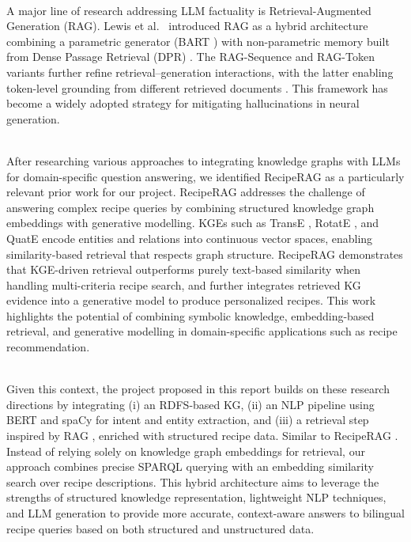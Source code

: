\documentclass[conference]{IEEEtran}
\begin{document}
\noindent
\\
A major line of research addressing LLM factuality is Retrieval-Augmented Generation (RAG). Lewis et al.~\cite{lewis2020rag} introduced RAG as a hybrid architecture combining a parametric generator (BART \cite{lewis2019bart}) with non-parametric memory built from Dense Passage Retrieval (DPR) \cite{karpukhin2020dense_passage_retrieval}. The RAG-Sequence and RAG-Token variants further refine retrieval–generation interactions, with the latter enabling token-level grounding from different retrieved documents \cite{lewis2020rag}. This framework has become a widely adopted strategy for mitigating hallucinations in neural generation.


\noindent
\\
After researching various approaches to integrating knowledge graphs with LLMs for domain-specific question answering, we identified RecipeRAG \cite{loesch2025reciperag} as a particularly relevant prior work for our project. RecipeRAG addresses the challenge of answering complex recipe queries by combining structured knowledge graph embeddings with generative modelling. KGEs such as TransE \cite{bordes2013translating}, RotatE \cite{sun2019rotate}, and QuatE \cite{zhang2019quaternion} encode entities and relations into continuous vector spaces, enabling similarity-based retrieval that respects graph structure. RecipeRAG demonstrates that KGE-driven retrieval outperforms purely text-based similarity when handling multi-criteria recipe search, and further integrates retrieved KG evidence into a generative model to produce personalized recipes. This work highlights the potential of combining symbolic knowledge, embedding-based retrieval, and generative modelling in domain-specific applications such as recipe recommendation.


\noindent
\\
Given this context, the project proposed in this report builds on these research directions by integrating (i) an RDFS-based KG, (ii) an NLP pipeline using BERT \cite{devlin2019bert} and spaCy \cite{honnibal2020spacy} for intent and entity extraction, and (iii) a retrieval step inspired by RAG \cite{lewis2020rag}, enriched with structured recipe data. Similar to RecipeRAG \cite{loesch2025reciperag}. Instead of relying solely on knowledge graph embeddings for retrieval, our approach combines precise SPARQL querying with an embedding similarity search over recipe descriptions.
This hybrid architecture aims to leverage the strengths of structured knowledge representation, lightweight NLP techniques, and LLM generation to provide more accurate, context-aware answers to bilingual recipe queries based on both structured and unstructured data.
\end{document}
